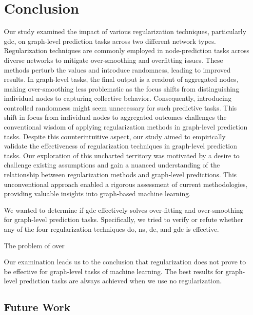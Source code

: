 %
\chapter{Conclusion}
\label{sec:conclusion}

Our study examined the impact of various regularization techniques, particularly \ac{gdc}, on graph-level prediction tasks across two different network types. Regularization techniques are commonly employed in node-prediction tasks across diverse networks to mitigate over-smoothing and overfitting issues.
These methods perturb the values and introduce randomness, leading to improved results.
In graph-level tasks, the final output is a readout of aggregated nodes, making over-smoothing less problematic as the focus shifts from distinguishing individual nodes to capturing collective behavior.
Consequently, introducing controlled randomness might seem unnecessary for such predictive tasks.
This shift in focus from individual nodes to aggregated outcomes challenges the conventional wisdom of applying regularization methods in graph-level prediction tasks.
Despite this counterintuitive aspect, our study aimed to empirically validate the effectiveness of regularization techniques in graph-level prediction tasks.
Our exploration of this uncharted territory was motivated by a desire to challenge existing assumptions and gain a nuanced understanding of the relationship between regularization methods and graph-level predictions.
This unconventional approach enabled a rigorous assessment of current methodologies, providing valuable insights into graph-based machine learning.

We wanted to determine if \ac{gdc} effectively solves over-fitting and over-smoothing for graph-level prediction tasks.
Specifically, we tried to verify or refute whether any of the four regularization techniques \ac{do}, \ac{ns}, \ac{de}, and \ac{gdc} is effective.

The problem of over

Our examination leads us to the conclusion that regularization does not prove to be effective for graph-level tasks of machine learning.
The best results for graph-level prediction tasks are always achieved when we use no regularization.

\section{Future Work}
\label{sec:conclusion:future}

